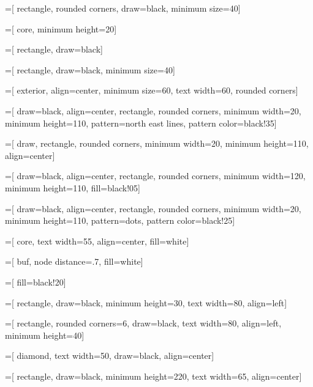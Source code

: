 \usepackage{siunitx}
\usepackage{listings}
\usepackage{tikz}
\usetikzlibrary{arrows,babel,backgrounds,fit,patterns,petri,positioning,shapes}


=[
	rectangle,
	rounded corners,
	draw=black,
	minimum size=40]

=[
	core,
	minimum height=20]

=[
	rectangle,
	draw=black]

=[
	rectangle,
	draw=black,
	minimum size=40]

=[
	exterior,
	align=center,
	minimum size=60,
	text width=60,
	rounded corners]

=[
	draw=black,
	align=center,
	rectangle,
	rounded corners,
	minimum width=20,
	minimum height=110,
	pattern=north east lines,
	pattern color=black!35]

=[
	draw,
	rectangle,
	rounded corners,
	minimum width=20,
	minimum height=110,
	align=center]

=[
	draw=black,
	align=center,
	rectangle,
	rounded corners,
	minimum width=120,
	minimum height=110,
	fill=black!05]

=[
	draw=black,
	align=center,
	rectangle,
	rounded corners,
	minimum width=20,
	minimum height=110,
	pattern=dots,
	pattern color=black!25]

=[
	core,
	text width=55,
	align=center,
	fill=white]
	
=[
	buf,
	node distance=.7,
	fill=white]
	
=[
	fill=black!20]

=[
	rectangle,
	draw=black,
	minimum height=30,
	text width=80,
	align=left]
	
=[
	rectangle,
	rounded corners=6,
	draw=black,
	text width=80,
	align=left,
	minimum height=40]

=[
	diamond,
	text width=50,
	draw=black,
	align=center]
	
=[
	rectangle,
	draw=black,
	minimum height=220,
	text width=65,
	align=center]

\newcommand{\epg}[3]{
	Buffer {#1}\\
	[44pt]EP{#2}\\
	[44pt]{#3} Bytes}

